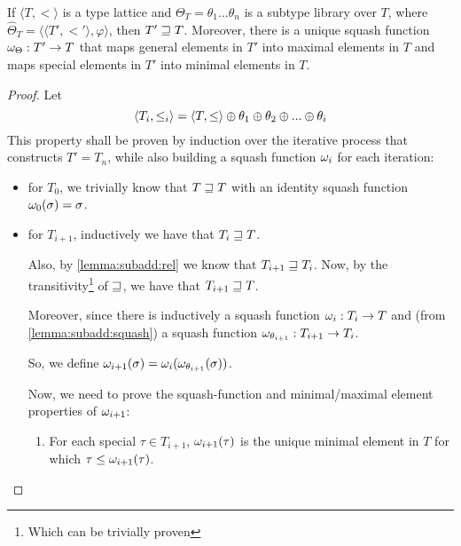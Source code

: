 \documentclass[main.tex]{subfiles}
\begin{document}
\begin{prop}\label{prop:makesquashfun}
    If $\langle T, \less \rangle$ is a type lattice and
    $\Theta_T = \theta_1 ... \theta_n$ is a subtype library over $T$, where
    $\hat{\Theta}_T = \langle \langle T', \less' \rangle, \varphi \rangle$,
    then $T' \sqsupseteq T$. Moreover, there is a unique squash function
    $\omega_{\Theta} : T' \rightarrow T$ that maps general elements in $T'$ into
    maximal elements in $T$ and maps special elements in $T'$ into minimal elements
    in $T$.
\end{prop}
\begin{proof}
    Let \[
        \langle T_i, \leq_i \rangle = \langle T, \leq \rangle
        \oplus \theta_1 \oplus \theta_2 \oplus ... \oplus \theta_i
    \]
    This property shall be proven by induction over the iterative process
    that constructs $T' = T_n$, while also building a squash function
    $\omega_i$ for each iteration:
    \begin{itemize}
        \item for $T_0$, we trivially know that $T \sqsupseteq T$ with an identity
            squash function $\omega_0(\sigma) = \sigma$.
        \item for $T_{i + 1}$, inductively we have that $T_i \sqsupseteq T$.

            Also, by \cref{lemma:subadd:rel} we know that $T_{i + 1} \sqsupseteq T_{i}$.
            Now, by the transitivity\footnote{Which can be trivially
            proven} of $\sqsupseteq$, we have that $T_{i + 1} \sqsupseteq T$.

            Moreover, since there is inductively a squash function
            $\omega_i : T_i \rightarrow T$ and (from \cref{lemma:subadd:squash})
            a squash function $\omega_{\theta_{i + 1}} : T_{i + 1} \rightarrow T_i$.

            So, we define
            $\omega_{i + 1}(\sigma) = \omega_i(\omega_{\theta_{i + 1}}(\sigma))$.

            Now, we need to prove the squash-function and minimal/maximal element
            properties of $\omega_{i + 1}$:
            \begin{enumerate}
                \item For each special
                    $\tau \in T_{i + 1}$, $\omega_{i + 1}(\tau)$ is the unique
                    minimal element in $T$ for which $\tau \leq \omega_{i + 1}(\tau)$.


\end{enumerate}
\end{itemize}
\end{proof}
\end{document}
